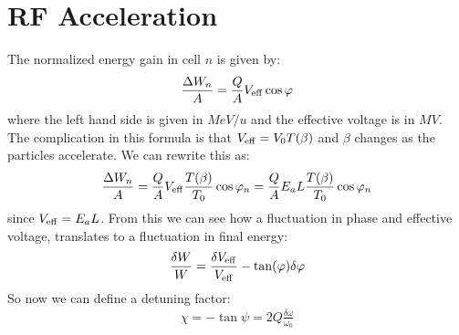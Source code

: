\documentclass{article}
\numberwithin{equation}{section}
\begin{document}
\section{RF Acceleration}
The normalized energy gain in cell $n$ is given by:
\begin{align}
\frac{\Delta W_n}{A} = \frac{Q}{A} V_{\rm eff} \cos \varphi
\end{align}
where the left hand side is given in $\si{MeV/u}$ and the effective voltage is in $\si{MV}$. The complication in this formula is that $V_{\rm eff} = V_0 T(\beta)$ and $\beta$ changes as the particles accelerate. We can rewrite this as:
\begin{align}
\frac{\Delta W_n}{A} = \frac{Q}{A} V_{\rm eff} \frac{T(\beta)}{T_0} \cos \varphi_n = \frac{Q}{A} E_a L \frac{T(\beta)}{T_0} \cos \varphi_n
\end{align}
since $V_{\rm eff} = E_a L$. From this we can see how a fluctuation in phase and effective voltage, translates to a fluctuation in final energy:
\begin{align}
\frac{\delta W}{W} = \frac{\delta V_{\rm eff}}{V_{\rm eff}} - \tan (\varphi) \delta \varphi
\end{align}
So now we can define a detuning factor:
\begin{align}
\chi = -\tan \psi = 2 Q \frac{\delta \omega}{\omega_0}
\end{align}
\end{document}
